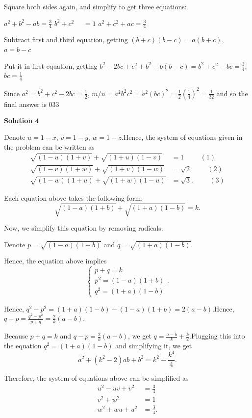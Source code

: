 \begin{enumerate}
 Square both sides again, and simplify to get three equations:

 $a^2+b^2-ab=\frac{3}{4}$
$b^2+c^2~ ~ ~ ~ ~ ~=1$
$a^2+c^2+ac=\frac{3}{4}$

 Subtract first and third equation, getting $(b+c)(b-c)=a(b+c)$, $a=b-c$

 Put it in first equation, getting $b^2-2bc+c^2+b^2-b(b-c)=b^2+c^2-bc=\frac{3}{4}$, $bc=\frac{1}{4}$

 Since $a^2=b^2+c^2-2bc=\frac{1}{2}$, $m/n = a^2b^2c^2 = a^2(bc)^2 = \frac{1}{2}\left(\frac{1}{4}\right)^2=\frac{1}{32}$  and so the final answer is $\boxed{033}$




\textbf{Solution 4}

Denote $u = 1 - x$, $v = 1 - y$, $w = 1 - z$.Hence, the system of equations given in the problem can be written as
 \begin{align*} \sqrt{(1-u)(1+v)} + \sqrt{(1+u)(1-v)} & = 1 \hspace{1cm} (1) \\ \sqrt{(1-v)(1+w)} + \sqrt{(1+v)(1-w)} & = \sqrt{2} \hspace{1cm} (2) \\ \sqrt{(1-w)(1+u)} + \sqrt{(1+w)(1-u)} & = \sqrt{3} . \hspace{1cm} (3)  \end{align*}


 Each equation above takes the following form:
 \[ \sqrt{(1-a)(1+b)} + \sqrt{(1+a)(1-b)} = k . \]

 Now, we simplify this equation by removing radicals.

 Denote $p = \sqrt{(1-a)(1+b)}$ and $q = \sqrt{(1+a)(1-b)}$.

 Hence, the equation above implies
 \[ \left\{ \begin{array}{l} p + q = k \\ p^2 = (1-a)(1+b) \\ q^2 = (1+a)(1-b) \end{array} \right.. \]

 Hence, $q^2 - p^2 = (1+a)(1-b) - (1-a)(1+b) = 2 (a-b)$.Hence, $q - p = \frac{q^2 - p^2}{p+q} = \frac{2}{k} (a-b)$.

 Because $p + q = k$ and $q - p = \frac{2}{k} (a-b)$, we get $q = \frac{a-b}{k} + \frac{k}{2}$.Plugging this into the equation $q^2 = (1+a)(1-b)$ and simplifying it, we get
 \[ a^2 + \left( k^2 - 2 \right) ab + b^2 = k^2 - \frac{k^4}{4} . \]

 Therefore, the system of equations above can be simplified as
 \begin{align*} u^2 - uv + v^2 & = \frac{3}{4} \\ v^2 + w^2 & = 1 \\ w^2 + wu + u^2 & = \frac{3}{4}  . \end{align*}



\end{enumerate}
